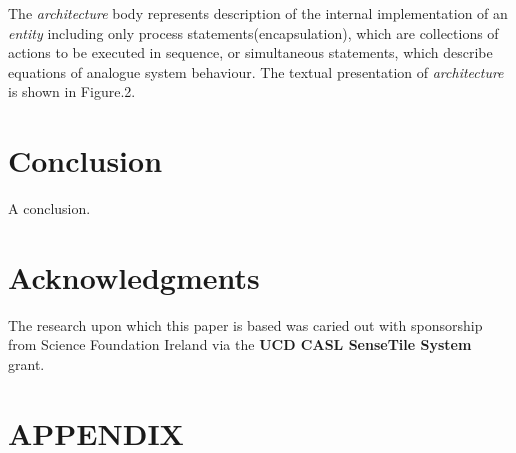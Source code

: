 \documentclass{article}
\newcommand{\ent}{\emph{entity}\xspace}
\newcommand{\arch}{\emph{architecture}\xspace}
\begin{document}
The \arch body represents description of the internal implementation 
of an \ent including only process statements(encapsulation), which 
are collections  of actions to be executed in sequence, or simultaneous statements, 
which describe equations of analogue system behaviour. 
The textual presentation of \arch is shown in Figure.2.


\section{Conclusion}

A conclusion.

\section {Acknowledgments}
The research upon which this paper is based was caried out with
sponsorship from Science Foundation Ireland via the 
\textbf{UCD CASL SenseTile System} grant.






\appendix
\newpage
\section {APPENDIX}
























\end{document}
